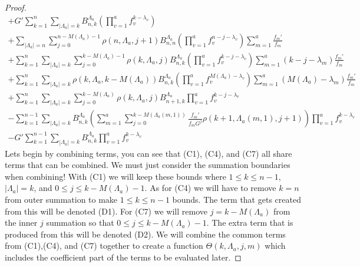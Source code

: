 \documentclass[11pt]{article}
\theoremstyle{plain}
\theoremstyle{definition}
\begin{document}
\begin{proof}
\begin{align*}
+ G' \sum_{k=1}^n \sum_{|\Lambda_a|=k}B_{n,k}^{\Lambda_a} \left(\prod_{v=1}^af_v^{k-\lambda_v}\right)\tag{C2}\\
+\sum_{|\Lambda_a|=n} \sum_{j=0}^{n-M(\Lambda_a)-1}\rho(n,\Lambda_a,j+1)B_{n,n}^{\Lambda_a} \left(\prod_{v=1}^af_v^{n-j-\lambda_v}\right)\sum_{m=1}^a \frac{f_m'}{f_m} \tag{C3} \\
+\sum_{k=1}^n \sum_{|\Lambda_a|=k}\sum_{j=0}^{k-M(\Lambda_a)-1} \rho(k,\Lambda_a,j)B_{n,k}^{\Lambda_a}\left(\prod_{v=1}^a f_v^{k-j-\lambda_v}\right) \sum_{m=1}^a (k-j-\lambda_m)\frac{f_m'}{f_m}\tag{C4}\\
+ \sum_{k=1}^n \sum_{|\Lambda_a|=k} \rho(k,\Lambda_a,k-M(\Lambda_a))B_{n,k}^{\Lambda_a}\left(\prod_{v=1}^a f_v^{M(\Lambda_a)-\lambda_v}\right) \sum_{m=1}^a (M(\Lambda_a)-\lambda_m)\frac{f_m'}{f_m}\tag{C5}\\
+ \sum_{k=1}^n \sum_{|\Lambda_a|=k} \sum_{j=0}^{k-M(\Lambda_a)}\rho(k,\Lambda_a,j)B_{n+1,k}^{\Lambda_a} \prod_{v=1}^a f_v^{k-j-\lambda_v} \tag{C6} \\
-\sum_{k=1}^{n-1} \sum_{|\Lambda_a|=k} B_{n,k}^{\Lambda_a}\left(\sum_{m=1}^a \sum_{j=0}^{k-M(\Lambda_a(m,1))}\frac{f_m'}{f_mG^j}\rho(k+1,\Lambda_a(m,1),j+1)\right) \prod_{v=1}^a f_v^{k-\lambda_v} \tag{C7}\\
-G'\sum_{k=1}^{n-1} \sum_{|\Lambda_a|=k} B_{n,k}^{\Lambda_a}\prod_{v=1}^a f_v^{k-\lambda_v}\tag{C8}
\end{align*}
Lets begin by combining terms, you can see that (C1), (C4), and (C7) all share terms that can be combined. We must just consider the summation boundaries when combining!
With (C1) we will keep these bounds where $1 \le k \le n-1$, $|\Lambda_a|=k$, and $0 \le j \le k-M(\Lambda_a)-1$. As for (C4) we will have to remove $k=n$ from outer summation to make $1 \le k \le n-1$ bounds. The term that gets created from this will be denoted (D1). For (C7) we will remove $j=k-M(\Lambda_a)$ from the inner $j$ summation so that $0\le j\le k-M(\Lambda_a)-1$. The extra term that is produced from this will be denoted (D2). We will combine the common terms from (C1),(C4), and (C7) together to create a function $\Theta(k,\Lambda_a,j,m)$ which includes the coefficient part of the terms to be evaluated later. 


\end{proof}
\end{document}

